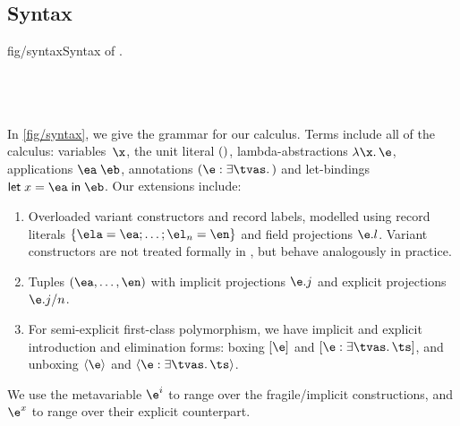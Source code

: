 \documentclass[acmsmall,screen,nonacm,review]{acmart}
\begin{document}
\subsection{Syntax}

\begin{bnffig}[t]{fig/syntax}{Syntax of \OML.}
\\[1ex]
\entry[Types]{\t}{
   \tv \and
   1 \and
   \tya \to \tyb \and
   \T \tys \and
   \Pi \iton \ti \and
   \tpoly \ts
}\\
\\
\\
\end{bnffig}

In \cref {fig/syntax}, we give the grammar for our calculus. Terms include
all of the \ML calculus: variables~$\x$, the unit literal $()$,
lambda-abstractions $\efun \x \e$, applications $\eapp \ea \eb$,
annotations $\eannot \e \tvs \t$ and let-bindings $\elet x \ea \eb$.
Our extensions include:
\begin{enumerate}
\item
  Overloaded variant constructors and record labels, modelled using record
  literals $\erecord { \ela = \ea; \ldots; \el_n = \en }$ and field
  projections $\efield \e l$. Variant constructors are not treated formally in \OML, but
    behave analogously in practice.
\item
  Tuples $(\ea, \ldots, \en)$ with implicit projections
  $\efield \e j$ and explicit projections $\exproj \e j n$.

\item
  For semi-explicit first-class polymorphism, we have implicit and explicit
    introduction and elimination forms: boxing $\epoly \e$ and $\expoly
    \e \tvs \ts$, and unboxing $\einst \e$ and $\exinst \e \tvs \ts$.

\end{enumerate}
We use the metavariable $\e^i$ to range over the
fragile/implicit constructions, and $\e^x$ to range over their
explicit counterpart.
\end{document}
